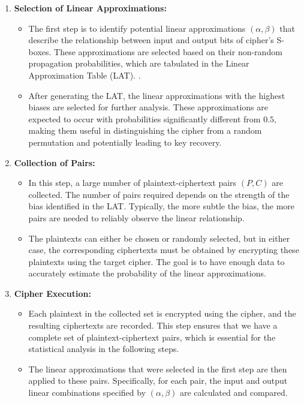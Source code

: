 \begin{enumerate}
\item \textbf{Selection of Linear Approximations:}
\begin{itemize}
\item The first step is to identify potential linear approximations $(\alpha, \beta)$ that describe the relationship between input and output bits of cipher’s S-boxes. These approximations are selected based on their non-random propagation probabilities, which are tabulated in the Linear Approximation Table (LAT).
.
\item After generating the LAT, the linear approximations with the highest biases are selected for further analysis. These approximations are expected to occur with probabilities significantly different from $0.5$, making them useful in distinguishing the cipher from a random permutation and potentially leading to key recovery.
\end{itemize}


\item \textbf{Collection of Pairs:}
\begin{itemize}
    \item In this step, a large number of plaintext-ciphertext pairs $(P, C)$ are collected. The number of pairs required depends on the strength of the bias identified in the LAT. Typically, the more subtle the bias, the more pairs are needed to reliably observe the linear relationship.
    \item The plaintexts can either be chosen or randomly selected, but in either case, the corresponding ciphertexts must be obtained by encrypting these plaintexts using the target cipher. The goal is to have enough data to accurately estimate the probability of the linear approximations.
\end{itemize}

\item \textbf{Cipher Execution:}
\begin{itemize}
    \item Each plaintext in the collected set is encrypted using the cipher, and the resulting ciphertexts are recorded. This step ensures that we have a complete set of plaintext-ciphertext pairs, which is essential for the statistical analysis in the following steps.
    \item The linear approximations that were selected in the first step are then applied to these pairs. Specifically, for each pair, the input and output linear combinations specified by $(\alpha, \beta)$ are calculated and compared.
\end{itemize}


\end{enumerate}
